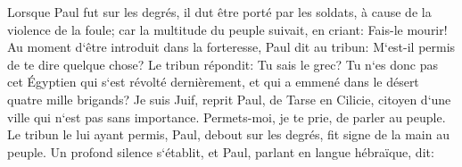 \verse Lorsque Paul fut sur les degrés, il dut être porté par les soldats, à cause de la violence de la foule; 
\verse car la multitude du peuple suivait, en criant: Fais-le mourir! 
\verse Au moment d`être introduit dans la forteresse, Paul dit au tribun: M`est-il permis de te dire quelque chose? Le tribun répondit: Tu sais le grec? 
\verse Tu n`es donc pas cet Égyptien qui s`est révolté dernièrement, et qui a emmené dans le désert quatre mille brigands? 
\verse Je suis Juif, reprit Paul, de Tarse en Cilicie, citoyen d`une ville qui n`est pas sans importance. Permets-moi, je te prie, de parler au peuple. 
\verse Le tribun le lui ayant permis, Paul, debout sur les degrés, fit signe de la main au peuple. Un profond silence s`établit, et Paul, parlant en langue hébraïque, dit: 

\chapter{}

